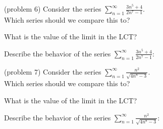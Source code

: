 \documentclass{ximera}
\begin{document}
\begin{problem}(problem 6)
Consider the series $\displaystyle{\sum_{n=1}^\infty \frac{3n^5 + 4}{2n^7 - 1}}$.\\
Which series should we compare this to?

\begin{multipleChoice}
\end{multipleChoice}

What is the value of the limit in the LCT?
\begin{multipleChoice}
\end{multipleChoice}

Describe the behavior of the series $\displaystyle{\sum_{n=1}^\infty \frac{3n^5 + 4}{2n^7 - 1}:}$
\begin{multipleChoice}
\end{multipleChoice}

\end{problem}


\begin{problem}(problem 7)
Consider the series $\displaystyle{\sum_{n=1}^\infty \frac{n^2}{\sqrt{4n^8 - 3}}}$.\\
Which series should we compare this to?

\begin{multipleChoice}
\end{multipleChoice}

What is the value of the limit in the LCT?
\begin{multipleChoice}
\end{multipleChoice}

Describe the behavior of the series $\displaystyle{\sum_{n=1}^\infty \frac{n^2}{\sqrt{4n^8 - 3}}:}$
\begin{multipleChoice}
\end{multipleChoice}

\end{problem}
\end{document}
